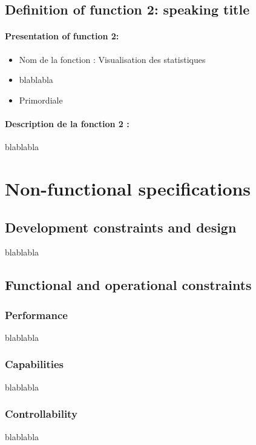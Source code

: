 \documentclass{polytech/polytech}
\numberwithin{figure}{chapter}
\begin{document}
\begin{appendix}
\subsection{Definition of function 2: speaking title}

\paragraph{Presentation of function 2:}

\begin{itemize}
    \item Nom de la fonction : Visualisation des statistiques
    \item blablabla
    \item Primordiale
\end{itemize}

\paragraph{Description de la fonction 2 :}

blablabla


\section{Non-functional specifications}

\subsection{Development constraints and design}

blablabla

\subsection{Functional and operational constraints}

\subsubsection{Performance}
blablabla

\subsubsection{Capabilities}
blablabla

\subsubsection{Controllability}
blablabla


\end{appendix}
\end{document}
